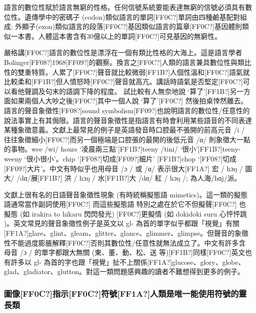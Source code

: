 語言的數位性賦於語言無窮的性格。任何信號系統要能表達無窮的信號必須具有數位性。遺傳學中的密碼子 (codon)類似語言的單詞[FF0C?]單詞由四種鹼基配對組成; 外顯子(exon)類似語言的段落[FF0C?]基因類似語言的篇章[FF0C?]基因體則類似一本書。人體這本書含有30億以上的單詞[FF0C?]可見基因的無窮性。

嚴格講[FF0C?]語言的數位性是漂浮在一個有類比性格的大海上。這是語言學者 Bolinger[FF08?]1968[FF09?]的觀察。換言之[FF0C?]人類的語言兼具數位性與類比性的雙重特質。人累了[FF0C?]聲音就比較微弱[FF1B?]人個性溫和[FF0C?]語氣就比較柔和[FF1B?]但人憤怒時[FF0C?]聲音就高亢。講話時語氣是否堅定[FF0C?]可以看他聲調及句末的語調下降的程度。 試比較有人無奈地說 ‘算了’[FF1B?]另一方面如果兩個人大吵之後[FF0C?]其中一個人說 ‘算了’[FF0C?] 然後拍桌悻然離去。語言的聲音象徵性[FF08?]sound symbolism[FF09?]也說明語言的數位性/任意性的說法事實上有其侷限。語言的聲音象徵性是指語言有時會利用某些語音的不同表達某種象徵意義。文獻上最常見的例子是英語發音時口腔最不張開的前高元音 /i /  往往象徵細小[FF0C?]而另一個極端是口腔張的最開的後低元音  /ɑ/  則象徵大一點的事物。wee /wi/ hours ‘凌晨兩三點’[FF1B?]teeny /tini/  ‘很小’[FF1B?]teeny-weeny ‘很小很小’。chip ‘[FF08?]切成[FF09?]細片’ [FF1B?]chop ‘[FF08?]切成[FF09?]大片’。中文有時似乎也用母音 /ɔ / 或 /ɑ/ 表示很大[FF1A?] 宏 / hɔŋ /  圖大/ /dɑ/展[FF1B?] 洪 / hɔŋ / 水[FF1B?]大 /dɑ/ 紅 / hɔŋ /; 為人海/hɑj/派。

文獻上很有名的日語聲音象徵性現象 (有時統稱擬態語 mimetics)。這一類的擬態語通常當作副詞使用[FF0C?] 而這些擬態語 特別之處在於它不但擬聲[FF0C?] 也擬態 (如 irakira to hikaru 閃閃發光) [FF0C?]更擬情 (如 dokidoki suru 心怦怦跳 )。英文常見的聲音象徵性例子是英文以 gl-  為首的單字似乎都跟「視覺」有關[FF1A?]glare、glint、gleam、glitter、glance、glimmer、glimpse。但聲音的象徵性不能過度膨脹解釋[FF0C?]否則其數位性/任意性就無法成立了。中文有許多含母音 /ɔ /  的單字都跟大無關 (東、董、動、松、送 等)[FF1B?]同樣[FF0C?]英文也有許多以 gl-  為首的字也跟「視覺」扯不上關係[FF1A?]glucose、glory、globe、glad、gladiator、glutton。對這一類問題感興趣的讀者不難想得到更多的例子。

\subsubsection{圖像[FF0C?]指示[FF0C?]符號[FF1A?]人類是唯一能使用符號的靈長類} %

